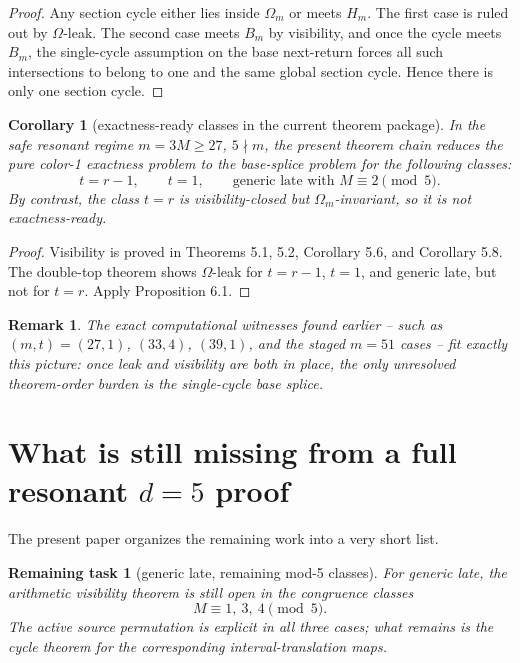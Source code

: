 \documentclass[11pt]{article}
\newtheorem{corollary}[theorem]{Corollary}
\newtheorem{remark}[theorem]{Remark}
\newtheorem{openproblem}[theorem]{Remaining task}
\newcommand{\1}{\mathbf 1}
\newcommand{\Hm}{H_m}
\newcommand{\Bm}{B_m}
\newcommand{\Om}{\Omega_m}
\begin{document}
\begin{proof}
Any section cycle either lies inside \(\Om\) or meets \(\Hm\).
The first case is ruled out by \(\Omega\)-leak.
The second case meets \(\Bm\) by visibility, and once the cycle meets \(\Bm\), the single-cycle assumption on the base next-return forces all such intersections to belong to one and the same global section cycle.
Hence there is only one section cycle.
\end{proof}

\begin{corollary}[exactness-ready classes in the current theorem package]
In the safe resonant regime \(m=3M\ge 27\), \(5\nmid m\), the present theorem chain reduces the pure color-1 exactness problem to the base-splice problem for the following classes:
\[
t=r-1,\qquad t=1,\qquad \text{generic late with } M\equiv 2 \pmod 5.
\]
By contrast, the class \(t=r\) is visibility-closed but \(\Omega_m\)-invariant, so it is not exactness-ready.
\end{corollary}

\begin{proof}
Visibility is proved in Theorems 5.1, 5.2, Corollary 5.6, and Corollary 5.8.
The double-top theorem shows \(\Omega\)-leak for \(t=r-1\), \(t=1\), and generic late, but not for \(t=r\).
Apply Proposition 6.1.
\end{proof}

\begin{remark}
The exact computational witnesses found earlier -- such as \((m,t)=(27,1)\), \((33,4)\), \((39,1)\), and the staged \(m=51\) cases -- fit exactly this picture: once leak and visibility are both in place, the only unresolved theorem-order burden is the single-cycle base splice.
\end{remark}

\section{What is still missing from a full resonant \(d=5\) proof}

The present paper organizes the remaining work into a very short list.

\begin{openproblem}[generic late, remaining mod-5 classes]
For generic late, the arithmetic visibility theorem is still open in the congruence classes
\[
M\equiv 1,\ 3,\ 4 \pmod 5.
\]
The active source permutation is explicit in all three cases; what remains is the cycle theorem for the corresponding interval-translation maps.
\end{openproblem}
\end{document}
